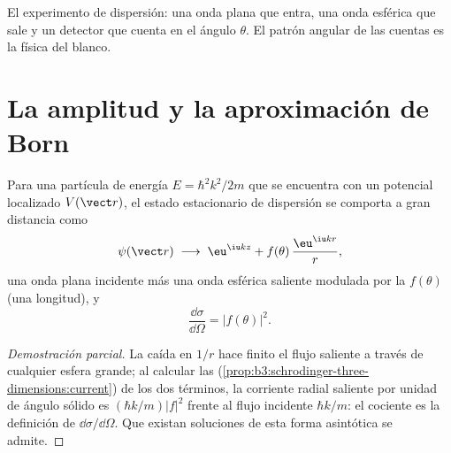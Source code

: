 \begin{omfigure}

{\small El experimento de dispersión: una onda plana que entra, una onda
esférica que sale y un detector que cuenta en el ángulo $\theta$. El patrón
angular de las cuentas es la física del blanco.}
\end{omfigure}

\section{La amplitud y la aproximación de Born}

\begin{theorem}\label{thm:b3:scattering-theory:amplitude}
Para una partícula de energía $E = \hbar^2k^2/2m$ que se encuentra con un
potencial localizado $V(\vect r)$, el estado estacionario de dispersión se
comporta a gran distancia como
\[
\psi(\vect r) \;\longrightarrow\;
\eu^{\iu kz} + f(\theta)\,\frac{\eu^{\iu kr}}{r} ,
\]
una onda plana incidente más una onda esférica saliente modulada por la
\emph{} $f(\theta)$ (una longitud), y
\[
\frac{\dd\sigma}{\dd\Omega} = |f(\theta)|^2 .
\]
\end{theorem}

\begin{proof}[Demostración parcial]
La caída en $1/r$ hace finito el flujo saliente a través de cualquier esfera
grande; al calcular las 
(\cref{prop:b3:schrodinger-three-dimensions:current}) de los dos
términos, la corriente radial saliente por unidad de ángulo sólido es
$(\hbar k/m)|f|^2$ frente al flujo incidente $\hbar k/m$: el cociente
es la definición de $\dd\sigma/\dd\Omega$. Que existan soluciones de esta
forma asintótica se admite.
\end{proof}

